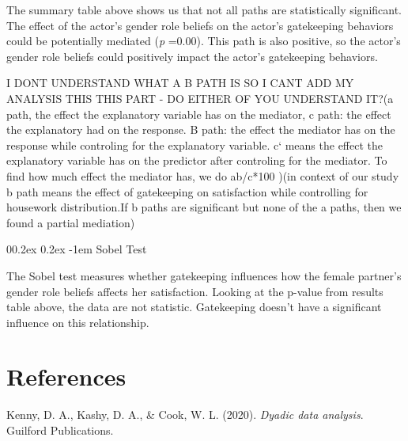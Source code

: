 \documentclass[
  man,floatsintext]{apa6}
\makeatletter
\let\oldparagraph\paragraph
\renewcommand{\paragraph}[1]{\oldparagraph{#1}\mbox{}}
\newlength{\cslhangindent}
\newlength{\cslentryspacingunit} %
\newenvironment{CSLReferences}[2] %
 {%
  \setlength{\parindent}{0pt}
  \ifodd #1
  \let\oldpar\par
  \def\par{\hangindent=\cslhangindent\oldpar}
  \fi
  \setlength{\parskip}{#2\cslentryspacingunit}
 }%
 {}
\renewcommand{\paragraph}{\@startsection{paragraph}{4}{\parindent}%
  {0\baselineskip \@plus 0.2ex \@minus 0.2ex}%
  {-1em}%
  {\normalfont\normalsize\bfseries\itshape\typesectitle}}
\makeatother
\begin{document}
The summary table above shows us that not all paths are statistically significant. The effect of the actor's gender role beliefs on the actor's gatekeeping behaviors could be potentially mediated (\emph{p} =0.00). This path is also positive, so the actor's gender role beliefs could positively impact the actor's gatekeeping behaviors.

I DONT UNDERSTAND WHAT A B PATH IS SO I CANT ADD MY ANALYSIS THIS THIS PART - DO EITHER OF YOU UNDERSTAND IT?(a path, the effect the explanatory variable has on the mediator, c path: the effect the explanatory had on the response. B path: the effect the mediator has on the response while controling for the explanatory variable. c` means the effect the explanatory variable has on the predictor after controling for the mediator. To find how much effect the mediator has, we do ab/c*100 )(in context of our study b path means the effect of gatekeeping on satisfaction while controlling for housework distribution.If b paths are significant but none of the a paths, then we found a partial mediation)

\hypertarget{sobel-test}{%
\paragraph{Sobel Test}\label{sobel-test}}

The Sobel test measures whether gatekeeping influences how the female partner's gender role beliefs affects her satisfaction. Looking at the p-value from results table above, the data are not statistic. Gatekeeping doesn't have a significant influence on this relationship.

\hypertarget{references}{%
\section{References}\label{references}}

\hypertarget{refs}{}
\begin{CSLReferences}{1}{0}
\leavevmode{}%
Kenny, D. A., Kashy, D. A., \& Cook, W. L. (2020). \emph{Dyadic data analysis}. Guilford Publications.

\end{CSLReferences}


\clearpage
\renewcommand{\listfigurename}{Figure captions}

\clearpage
\renewcommand{\listtablename}{Table captions}
\end{document}
